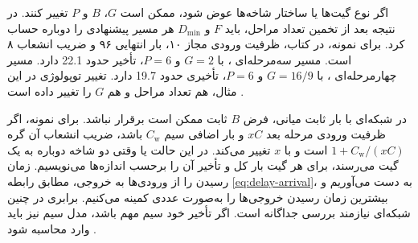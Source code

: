 اگر نوع گیت‌ها یا ساختار شاخه‌ها عوض شود، ممکن است \(G\)،
\(B\) و \(P\) تغییر کنند. در نتیجه بعد از تخمین تعداد مراحل،
باید \(F\) و \(D_{\min}\) هر مسیر پیشنهادی را دوباره حساب
کرد. برای نمونه، در  کتاب، ظرفیت ورودی مجاز ۱۰،
بار انتهایی ۹۶ و ضریب انشعاب ۸ است. مسیر سه‌مرحله‌ای
، با \(G=2\) و \(P=6\)، تأخیر
حدود \num{22.1} دارد. مسیر چهارمرحله‌ای
، با \(G=16/9\) و \(P=6\)،
تأخیری حدود \num{19.7} دارد. تغییر توپولوژی در این مثال، هم تعداد
مراحل و هم \(G\) را تغییر داده است
\cite[بخش  و جدول ،
صفحات ۱۶۸ و ۱۶۹]{weste}
\cite[اسلاید ۲۷]{logicaleffortslides}.

در شبکه‌ای با بار ثابت میانی، فرض \(B\) ثابت ممکن است
برقرار نباشد. برای نمونه، اگر ظرفیت ورودی مرحله بعد \(xC\)
و بار اضافی سیم \(C_{\mathrm w}\) باشد، ضریب انشعاب آن گره
\(1+C_{\mathrm w}/(xC)\) است و با \(x\) تغییر می‌کند.
در این حالت یا وقتی دو شاخه دوباره به یک گیت می‌رسند،
برای هر گیت بار کل و تأخیر آن را برحسب اندازه‌ها می‌نویسیم.
زمان رسیدن را از ورودی‌ها به خروجی، مطابق رابطه
\eqref{eq:delay-arrival}، به دست می‌آوریم و بیشترین زمان
رسیدن خروجی‌ها را به‌صورت عددی کمینه می‌کنیم. برابری
 در چنین شبکه‌ای نیازمند بررسی جداگانه است.
اگر تأخیر خود سیم مهم باشد، مدل سیم نیز باید وارد محاسبه شود
\cite[بخش‌های  و ،
صفحات ۱۷۱ تا ۱۷۳]{weste}.
